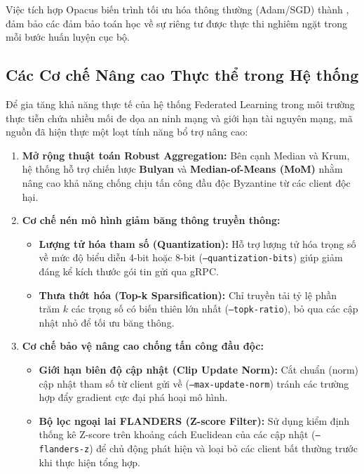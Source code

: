 Việc tích hợp Opacus \cite{yousefpour2021opacus} biến trình tối ưu hóa thông thường (Adam/SGD) thành , đảm bảo các đảm bảo toán học về sự riêng tư được thực thi nghiêm ngặt trong mỗi bước huấn luyện cục bộ.

\subsection{Các Cơ chế Nâng cao Thực thể trong Hệ thống}

Để gia tăng khả năng thực tế của hệ thống Federated Learning trong môi trường thực tiễn chứa nhiều mối đe dọa an ninh mạng và giới hạn tài nguyên mạng, mã nguồn đã hiện thực một loạt tính năng bổ trợ nâng cao:

\begin{enumerate}
    \item \textbf{Mở rộng thuật toán Robust Aggregation:}
    Bên cạnh Median và Krum, hệ thống hỗ trợ chiến lược \textbf{Bulyan} \cite{mhamdi2018byzantine} và \textbf{Median-of-Means (MoM)} \cite{lerasle2011robust} nhằm nâng cao khả năng chống chịu tấn công đầu độc Byzantine từ các client độc hại.
    
    \item \textbf{Cơ chế nén mô hình giảm băng thông truyền thông:}
    \begin{itemize}
        \item \textbf{Lượng tử hóa tham số (Quantization):} Hỗ trợ lượng tử hóa trọng số về mức độ biểu diễn 4-bit hoặc 8-bit (\texttt{--quantization-bits}) giúp giảm đáng kể kích thước gói tin gửi qua gRPC.
        \item \textbf{Thưa thớt hóa (Top-k Sparsification):} Chỉ truyền tải tỷ lệ phần trăm $k$ các trọng số có biến thiên lớn nhất (\texttt{--topk-ratio}), bỏ qua các cập nhật nhỏ để tối ưu băng thông.
    \end{itemize}

    \item \textbf{Cơ chế bảo vệ nâng cao chống tấn công đầu độc:}
    \begin{itemize}
        \item \textbf{Giới hạn biên độ cập nhật (Clip Update Norm):} Cắt chuẩn (norm) cập nhật tham số từ client gửi về (\texttt{--max-update-norm}) tránh các trường hợp đẩy gradient cực đại phá hoại mô hình.
        \item \textbf{Bộ lọc ngoại lai FLANDERS (Z-score Filter):} Sử dụng kiểm định thống kê Z-score trên khoảng cách Euclidean của các cập nhật (\texttt{--flanders-z}) để chủ động phát hiện và loại bỏ các client bất thường trước khi thực hiện tổng hợp.
    \end{itemize}


\end{enumerate}
